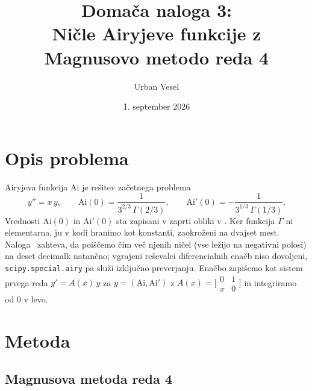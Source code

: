 \documentclass[11pt,a4paper]{article}
\title{Domača naloga 3:\\ Ničle Airyjeve funkcije z Magnusovo metodo reda 4}
\author{Urban Vesel}
\date{1. september 2026}
\begin{document}
\maketitle

\section{Opis problema}

Airyjeva funkcija $\mathrm{Ai}$ je rešitev začetnega problema
\begin{equation}
  y'' = x\,y, \qquad
  \mathrm{Ai}(0) = \frac{1}{3^{2/3}\,\Gamma(2/3)}, \qquad
  \mathrm{Ai}'(0) = -\frac{1}{3^{1/3}\,\Gamma(1/3)} .
\end{equation} 
Vrednosti $\mathrm{Ai}(0)$ in $\mathrm{Ai}'(0)$ sta zapisani v zaprti obliki
v \cite[razdelka 9.2.3 in 9.2.4]{dlmf}. Ker funkcija $\Gamma$ ni elementarna,
ju v kodi hranimo kot konstanti, zaokroženi na dvajset mest.
Naloga~\cite{skripta} zahteva, da poiščemo čim več njenih ničel (vse ležijo
na negativni polosi) na deset decimalk natančno; vgrajeni reševalci diferencialnih enačb niso
dovoljeni, \texttt{scipy.special.airy} pa služi izključno preverjanju.
Enačbo zapišemo kot sistem prvega reda $y' = A(x)\,y$ za
$y = (\mathrm{Ai}, \mathrm{Ai}')$ z
$A(x) = \bigl[\begin{smallmatrix}0&1\\ x&0\end{smallmatrix}\bigr]$
in integriramo od $0$ v levo.

\section{Metoda}

\subsection{Magnusova metoda reda 4}
\end{document}
